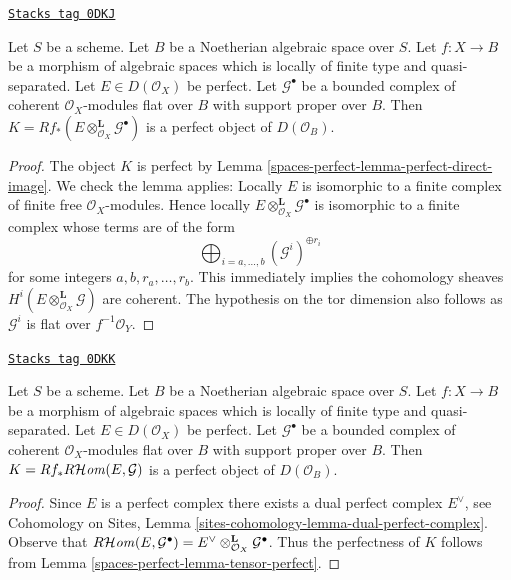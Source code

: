 \begin{lemma}
\label{spaces-perfect-lemma-tensor-perfect}
\href{https://stacks.math.columbia.edu/tag/0DKJ}{\texttt{Stacks tag 0DKJ}}

Let $S$ be a scheme. Let $B$ be a Noetherian algebraic space over $S$.
Let $f : X \to B$ be a morphism of algebraic spaces which is locally of
finite type and quasi-separated. Let $E \in D(\mathcal{O}_X)$ be perfect.
Let $\mathcal{G}^\bullet$ be a bounded complex of coherent
$\mathcal{O}_X$-modules flat over $B$ with support proper over $B$. Then
$K = Rf_*(E \otimes^\mathbf{L}_{\mathcal{O}_X} \mathcal{G}^\bullet)$
is a perfect object of $D(\mathcal{O}_B)$.
\end{lemma}

\begin{proof}
The object $K$ is perfect by Lemma \ref{spaces-perfect-lemma-perfect-direct-image}.
We check the lemma applies: Locally $E$ is isomorphic to a finite complex
of finite free $\mathcal{O}_X$-modules. Hence locally
$E \otimes^\mathbf{L}_{\mathcal{O}_X} \mathcal{G}^\bullet$ is isomorphic
to a finite complex whose terms are of the form
$$
\bigoplus\nolimits_{i = a, \ldots, b} (\mathcal{G}^i)^{\oplus r_i}
$$
for some integers $a, b, r_a, \ldots, r_b$. This immediately implies the
cohomology sheaves $H^i(E \otimes^\mathbf{L}_{\mathcal{O}_X} \mathcal{G})$
are coherent. The hypothesis on the tor dimension also follows as
$\mathcal{G}^i$ is flat over $f^{-1}\mathcal{O}_Y$.
\end{proof}

\begin{lemma}
\label{spaces-perfect-lemma-ext-perfect}
\href{https://stacks.math.columbia.edu/tag/0DKK}{\texttt{Stacks tag 0DKK}}

Let $S$ be a scheme. Let $B$ be a Noetherian algebraic space over $S$.
Let $f : X \to B$ be a morphism of algebraic spaces which is locally of
finite type and quasi-separated. Let $E \in D(\mathcal{O}_X)$ be perfect.
Let $\mathcal{G}^\bullet$ be a bounded complex of coherent
$\mathcal{O}_X$-modules flat over $B$ with support proper over $B$. Then
$K = Rf_*R\mathcal{H}\mathit{om}(E, \mathcal{G})$ is a perfect object of $D(\mathcal{O}_B)$.
\end{lemma}

\begin{proof}
Since $E$ is a perfect complex there exists a dual perfect complex
$E^\vee$, see Cohomology on Sites, Lemma
\ref{sites-cohomology-lemma-dual-perfect-complex}.
Observe that $R\mathcal{H}\mathit{om}(E, \mathcal{G}^\bullet) =
E^\vee \otimes^\mathbf{L}_{\mathcal{O}_X} \mathcal{G}^\bullet$.
Thus the perfectness of $K$ follows from Lemma \ref{spaces-perfect-lemma-tensor-perfect}.
\end{proof}

